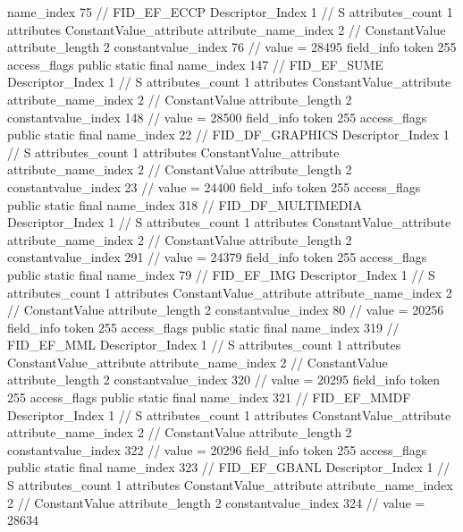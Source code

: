 {{{{{				name_index	75		// FID_EF_ECCP
				Descriptor_Index	1		// S
				attributes_count	1
				attributes {
				ConstantValue_attribute {
					attribute_name_index	2		// ConstantValue
					attribute_length	2
					constantvalue_index	76		// value = 28495
				}
				}
			}
			field_info {
				token	255
				access_flags	public static final
				name_index	147		// FID_EF_SUME
				Descriptor_Index	1		// S
				attributes_count	1
				attributes {
				ConstantValue_attribute {
					attribute_name_index	2		// ConstantValue
					attribute_length	2
					constantvalue_index	148		// value = 28500
				}
				}
			}
			field_info {
				token	255
				access_flags	public static final
				name_index	22		// FID_DF_GRAPHICS
				Descriptor_Index	1		// S
				attributes_count	1
				attributes {
				ConstantValue_attribute {
					attribute_name_index	2		// ConstantValue
					attribute_length	2
					constantvalue_index	23		// value = 24400
				}
				}
			}
			field_info {
				token	255
				access_flags	public static final
				name_index	318		// FID_DF_MULTIMEDIA
				Descriptor_Index	1		// S
				attributes_count	1
				attributes {
				ConstantValue_attribute {
					attribute_name_index	2		// ConstantValue
					attribute_length	2
					constantvalue_index	291		// value = 24379
				}
				}
			}
			field_info {
				token	255
				access_flags	public static final
				name_index	79		// FID_EF_IMG
				Descriptor_Index	1		// S
				attributes_count	1
				attributes {
				ConstantValue_attribute {
					attribute_name_index	2		// ConstantValue
					attribute_length	2
					constantvalue_index	80		// value = 20256
				}
				}
			}
			field_info {
				token	255
				access_flags	public static final
				name_index	319		// FID_EF_MML
				Descriptor_Index	1		// S
				attributes_count	1
				attributes {
				ConstantValue_attribute {
					attribute_name_index	2		// ConstantValue
					attribute_length	2
					constantvalue_index	320		// value = 20295
				}
				}
			}
			field_info {
				token	255
				access_flags	public static final
				name_index	321		// FID_EF_MMDF
				Descriptor_Index	1		// S
				attributes_count	1
				attributes {
				ConstantValue_attribute {
					attribute_name_index	2		// ConstantValue
					attribute_length	2
					constantvalue_index	322		// value = 20296
				}
				}
			}
			field_info {
				token	255
				access_flags	public static final
				name_index	323		// FID_EF_GBANL
				Descriptor_Index	1		// S
				attributes_count	1
				attributes {
				ConstantValue_attribute {
					attribute_name_index	2		// ConstantValue
					attribute_length	2
					constantvalue_index	324		// value = 28634
				}
}}}}}}
